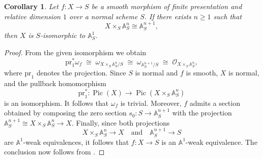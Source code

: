 \documentclass[10pt,a4paper]{amsart}
\newtheorem{corollary}{Corollary}
\renewcommand{\AA}{\mathbb{A}}
\newcommand{\Pic}{\operatorname{Pic}}
\begin{document}
\begin{corollary}
Let $f:X\to S$ be a smooth morphism of finite presentation and relative dimension $1$ over a normal scheme $S$. If there exists $n\geq 1$ such that
\[
X\times_S \AA^n_S \cong \AA^{n+1}_S,
\]
then $X$ is $S$-isomorphic to $\AA^1_S$.
\end{corollary}

\begin{proof}
From the given isomorphism we obtain
\[
\mathrm{pr}_1^*\omega_f
\;\cong\;
\omega_{X\times_S \AA^n_S/S}
\;\cong\;
\omega_{\AA^{n+1}_S/S}
\;\cong\;
\mathcal{O}_{X\times_S \AA^n_S},
\]
where $\mathrm{pr}_1$ denotes the projection. Since $S$ is normal and $f$ is smooth, $X$ is normal, and the pullback homomorphism
\[
\mathrm{pr}_1^*:\Pic(X)\to \Pic(X\times_S \AA^n_S)
\]
is an isomorphism. It follows that $\omega_f$ is trivial. Moreover, $f$ admits a section obtained by composing the zero section $s_0:S\to \AA^{n+1}_S$ with the projection $\AA^{n+1}_S\cong X\times_S \AA^n_S\to X$. Finally, since both projections
\[
X\times_S \AA^n_S\to X
\quad\text{and}\quad
\AA^{n+1}_S\to S
\]
are $\AA^1$-weak equivalences, it follows that $f:X\to S$ is an $\AA^1$-weak equivalence. The conclusion now follows from .
\end{proof}
\end{document}
